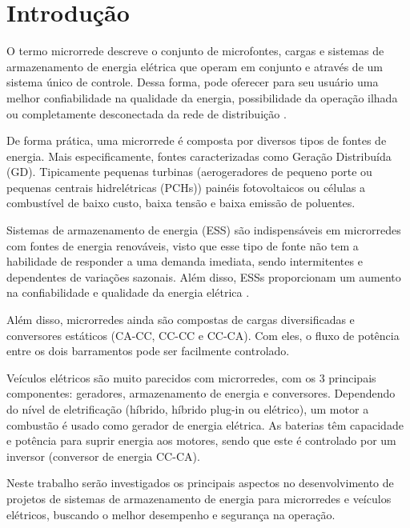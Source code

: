 \chapter{Introdução}



O termo microrrede descreve o conjunto de microfontes, cargas e sistemas de armazenamento de energia elétrica que operam em conjunto e através de um sistema único de controle. Dessa forma, pode oferecer para seu usuário uma melhor confiabilidade na qualidade da energia, possibilidade da operação ilhada ou completamente desconectada da rede de distribuição \cite{Las02,Tan13}.

De forma prática, uma microrrede é composta por diversos tipos de fontes de energia. Mais especificamente, fontes caracterizadas como Geração Distribuída (GD). Tipicamente pequenas turbinas (aerogeradores de pequeno porte ou pequenas centrais hidrelétricas (PCHs)) painéis fotovoltaicos ou células a combustível de baixo custo, baixa tensão e baixa emissão de poluentes. 

Sistemas de armazenamento de energia (ESS) são indispensáveis em microrredes com fontes de energia renováveis, visto que esse tipo de fonte não tem a habilidade de responder a uma demanda imediata, sendo intermitentes e dependentes de variações sazonais. Além disso, ESSs proporcionam um aumento na confiabilidade e qualidade da energia elétrica \cite{Zob18}.

Além disso, microrredes ainda são compostas de cargas diversificadas e conversores estáticos (CA-CC, CC-CC e CC-CA). Com eles, o fluxo de potência entre os dois barramentos pode ser facilmente controlado.

Veículos elétricos são muito parecidos com microrredes, com os 3 principais componentes: geradores, armazenamento de energia e conversores. Dependendo do nível de eletrificação (híbrido, híbrido plug-in ou elétrico), um motor a combustão é usado como gerador de energia elétrica. As baterias têm capacidade e potência para suprir energia aos motores, sendo que este é controlado por um inversor (conversor de energia CC-CA).

Neste trabalho serão investigados os principais aspectos no desenvolvimento de projetos de sistemas de armazenamento de energia para microrredes e veículos elétricos, buscando o melhor desempenho e segurança na operação. 

